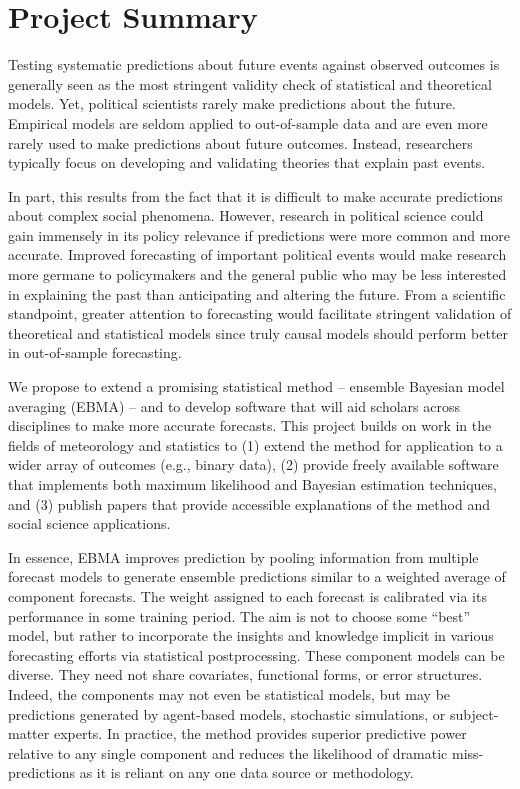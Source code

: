 \documentclass[pdftex,12pt,fullpage,oneside]{amsart}
\begin{document}
\section*{Project Summary}

\thispagestyle{empty}

Testing systematic predictions about future events against observed
outcomes is generally seen as the most stringent validity check of
statistical and theoretical models. Yet, political scientists rarely
make predictions about the future.  Empirical models are seldom
applied to out-of-sample data and are even more rarely used to make
predictions about future outcomes. Instead, researchers typically
focus on developing and validating theories that explain past events.

In part, this results from the fact that it is difficult to make
accurate predictions about complex social phenomena. However, research
in political science could gain immensely in its policy relevance if
predictions were more common and more accurate.  Improved forecasting
of important political events would make research more germane to
policymakers and the general public who may be less interested in
explaining the past than anticipating and altering the future.  From a
scientific standpoint, greater attention to forecasting would
facilitate stringent validation of theoretical and statistical models
since truly causal models should perform better in out-of-sample
forecasting.

We propose to extend a promising statistical method -- ensemble
Bayesian model averaging (EBMA) -- and to develop software that will
aid scholars across disciplines to make more accurate forecasts.
This project builds on work in the fields of meteorology and
statistics to (1) extend the method for application to a wider array
of outcomes (e.g., binary data), (2) provide freely available software
that implements both maximum likelihood and Bayesian estimation
techniques, and (3) publish papers that provide accessible
explanations of the method and social science applications.

In essence, EBMA improves prediction by pooling information from
multiple forecast models to generate ensemble predictions similar to a
weighted average of component forecasts. The weight assigned to each
forecast is calibrated via its performance in some training
period. The aim is not to choose some ``best'' model, but rather to
incorporate the insights and knowledge implicit in various forecasting
efforts via statistical postprocessing.  These component models can be
diverse.  They need not share covariates, functional forms, or error
structures. Indeed, the components may not even be statistical models,
but may be predictions generated by agent-based models, stochastic
simulations, or subject-matter experts.  In practice, the method provides
superior predictive power relative to any single component and reduces
the likelihood of dramatic miss-predictions as it is reliant on any
one data source or methodology.
\end{document}
